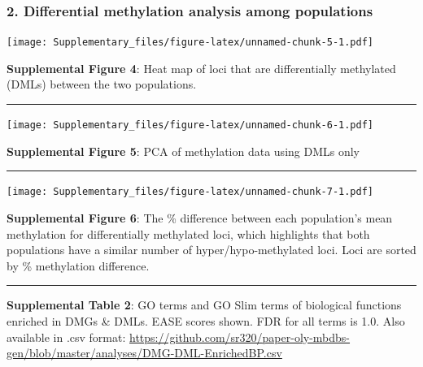 \documentclass[
]{article}
\begin{document}
\hypertarget{differential-methylation-analysis-among-populations}{%
\subsubsection{2. Differential methylation analysis among
populations}\label{differential-methylation-analysis-among-populations}}

\texttt{[image: Supplementary\_files/figure-latex/unnamed-chunk-5-1.pdf]}

\textbf{Supplemental Figure 4}: Heat map of loci that are differentially
methylated (DMLs) between the two populations.

\begin{center}\rule{0.5\linewidth}{0.5pt}\end{center}

\texttt{[image: Supplementary\_files/figure-latex/unnamed-chunk-6-1.pdf]}

\textbf{Supplemental Figure 5}: PCA of methylation data using DMLs only

\begin{center}\rule{0.5\linewidth}{0.5pt}\end{center}

\texttt{[image: Supplementary\_files/figure-latex/unnamed-chunk-7-1.pdf]}

\textbf{Supplemental Figure 6}: The \% difference between each
population's mean methylation for differentially methylated loci, which
highlights that both populations have a similar number of
hyper/hypo-methylated loci. Loci are sorted by \% methylation
difference.

\begin{center}\rule{0.5\linewidth}{0.5pt}\end{center}

\textbf{Supplemental Table 2}: GO terms and GO Slim terms of biological
functions enriched in DMGs \& DMLs. EASE scores shown. FDR for all terms
is 1.0. Also available in .csv format:
\url{https://github.com/sr320/paper-oly-mbdbs-gen/blob/master/analyses/DMG-DML-EnrichedBP.csv}
\end{document}
